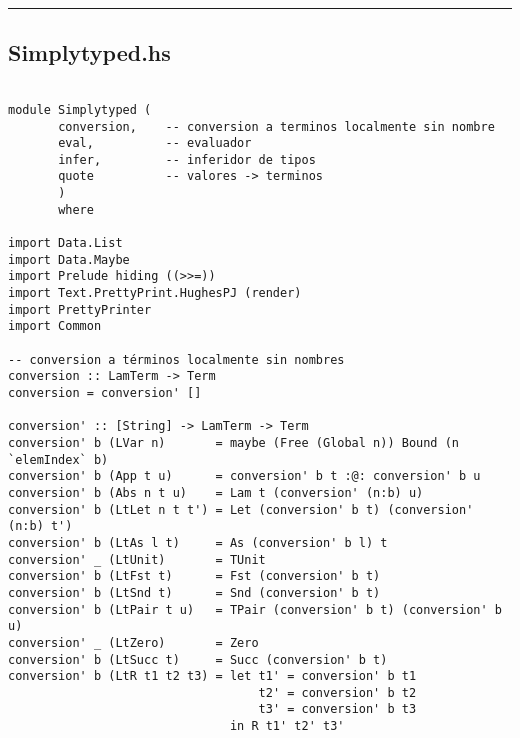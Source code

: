 \documentclass[a4paper]{report}
\begin{document}
\bigskip
\bigskip
\bigskip
\noindent\rule{16cm}{0.4pt}
\subsection*{Simplytyped.hs}
\begin{lstlisting}

module Simplytyped (
       conversion,    -- conversion a terminos localmente sin nombre
       eval,          -- evaluador
       infer,         -- inferidor de tipos
       quote          -- valores -> terminos
       )
       where

import Data.List
import Data.Maybe
import Prelude hiding ((>>=))
import Text.PrettyPrint.HughesPJ (render)
import PrettyPrinter
import Common

-- conversion a términos localmente sin nombres
conversion :: LamTerm -> Term
conversion = conversion' []

conversion' :: [String] -> LamTerm -> Term
conversion' b (LVar n)       = maybe (Free (Global n)) Bound (n `elemIndex` b)
conversion' b (App t u)      = conversion' b t :@: conversion' b u
conversion' b (Abs n t u)    = Lam t (conversion' (n:b) u)
conversion' b (LtLet n t t') = Let (conversion' b t) (conversion' (n:b) t')
conversion' b (LtAs l t)     = As (conversion' b l) t
conversion' _ (LtUnit)       = TUnit
conversion' b (LtFst t)      = Fst (conversion' b t)
conversion' b (LtSnd t)      = Snd (conversion' b t)
conversion' b (LtPair t u)   = TPair (conversion' b t) (conversion' b u)
conversion' _ (LtZero)       = Zero
conversion' b (LtSucc t)     = Succ (conversion' b t)
conversion' b (LtR t1 t2 t3) = let t1' = conversion' b t1
                                   t2' = conversion' b t2
                                   t3' = conversion' b t3
                               in R t1' t2' t3'

\end{lstlisting}
\pagebreak
\end{document}
